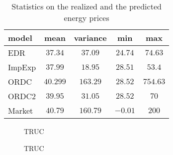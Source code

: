 
\begin{table}[H]
\centering
\begin{tabular}{l | c  c  c  c}
model & mean & variance & min & max \\
\hline
EDR & $37.34$ &  $37.09$ & $24.74$ &  $74.63$ \\
ImpExp & $37.99$ &  $18.95$ & $28.51$ &  $53.4$ \\
ORDC & $40.299$ & $163.29$ & $28.52$ & $754.63$ \\
ORDC2 & $39.95$ & $31.05$ & $28.52$ & $70$ \\
\hline
Market & $40.79$ &  $160.79$ & $ -0.01$ &  $200$ \\
\end{tabular}
\caption{Statistics on the realized and the predicted energy prices}
\end{table}

\begin{figure}[H]
    \centering
    \setlength\fheight{4cm}
    \setlength{}
    
    \caption{TRUC}
    \label{fig:capa}
\end{figure}

\begin{figure}[H]
    \centering
    \setlength\fheight{4cm}
    \setlength{}
    
    \caption{TRUC}
    \label{fig:ratio}
\end{figure}